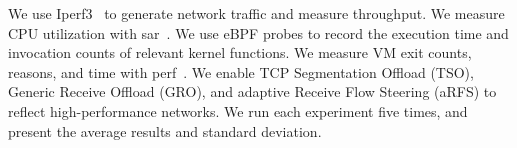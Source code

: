 We use Iperf3~\cite{iperf3} to generate network traffic and measure throughput.
We measure CPU utilization with sar~\cite{sar}.
We use eBPF probes to record the execution time and invocation counts of relevant kernel functions.
We measure VM exit counts, reasons, and time with perf~\cite{perf}.
We enable TCP Segmentation Offload (TSO), Generic Receive Offload (GRO), and adaptive Receive Flow Steering (aRFS)
to reflect high-performance networks. We run each experiment five times, and present the average results and standard deviation.







